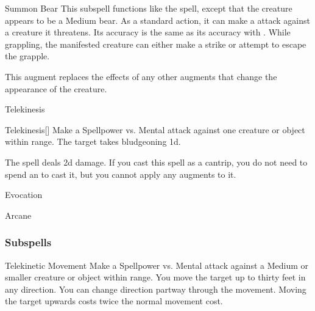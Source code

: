 \begin{ability}[\nth{2}]{Summon Bear}
This subspell functions like the  spell, except that the creature appears to be a Medium bear.
As a standard action, it can make a  attack against a creature it threatens.
Its accuracy is the same as its accuracy with .
While grappling, the manifested creature can either make a strike or attempt to escape the grapple.

This augment replaces the effects of any other augments that change the appearance of the creature.
\end{ability}
\vspace{0.25em}

\newpage
\begin{spellsection}{Telekinesis}

\begin{spellheader}
\end{spellheader}


\begin{ability}{Telekinesis}[]
Make a Spellpower vs. Mental attack against one creature or object within \rngmed range.
\hit The target takes bludgeoning  \plus1d.
\end{ability}



 The spell deals \minus2d damage. If you cast this spell as a cantrip,
you do not need to spend an  to cast it,
but you cannot apply any augments to it.


 Evocation

 Arcane
\end{spellsection}


\subsubsection{Subspells}


\begin{ability}[\nth{1}]{Telekinetic Movement}
Make a Spellpower vs. Mental attack against a Medium or smaller creature or object within \rngmed range.
\hit You move the target up to thirty feet in any direction.
You can change direction partway through the movement.
Moving the target upwards costs twice the normal movement cost.
\end{ability}
\vspace{0.25em}


